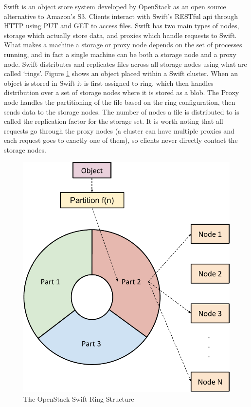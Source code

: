 Swift is an object store system developed by OpenStack as an open source
alternative to Amazon's S3. Clients interact with Swift's RESTful api through
HTTP using PUT and GET to access files. Swift has two main types of nodes,
storage which actually store data, and proxies which handle requests to Swift.
What makes a machine a storage or proxy node depends on the set of processes
running, and in fact a single machine can be both a storage node and a proxy
node. Swift distributes and replicates files across all storage nodes using
what are called `rings'. Figure \ref{fig:swift} shows an object placed
within a Swift cluster. When an object is stored in Swift it is first assigned
to ring, which then handles distribution over a set of storage nodes where it
is stored as a blob. The Proxy node handles the partitioning of the file based
on the ring configuration, then sends data to the storage nodes. The number of
nodes a file is distributed to is called the replication factor for the
storage set. It is worth noting that all requests go through the proxy nodes
(a cluster can have multiple proxies and each request goes to exactly one of
them), so clients never directly contact the storage nodes.

\begin{figure}[h]
\centering
\includegraphics[scale=0.7]{figures/swiftrings}
\caption{The OpenStack Swift Ring Structure}
\label{fig:swift}
\end{figure}

